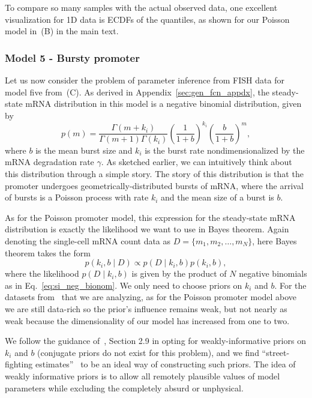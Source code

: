 To compare so many samples with the actual observed data, one excellent
visualization for 1D data is ECDFs of the quantiles, as shown for our Poisson
model in~(B) in the main text. 

\subsubsection{Model 5 - Bursty promoter}

Let us now consider the problem of parameter inference from FISH data for model
five from~(C). As derived in
Appendix~\ref{sec:gen_fcn_appdx}, the steady-state mRNA distribution in this
model is a negative binomial distribution, given by
\begin{equation}
p(m) = \frac{\Gamma(m+k_i)}{\Gamma(m+1)\Gamma(k_i)}
        \left(\frac{1}{1+b}\right)^{k_i}
        \left(\frac{b}{1+b}\right)^m,
\label{eq:si_neg_bionom}
\end{equation}
where $b$ is the mean burst size and $k_i$ is the burst rate nondimensionalized
by the mRNA degradation rate $\gamma$. As sketched earlier, we can intuitively
think about this distribution through a simple story. The story of this
distribution is that the promoter undergoes geometrically-distributed bursts of
mRNA, where the arrival of bursts is a Poisson process with rate $k_i$ and the
mean size of a burst is $b$.

As for the Poisson promoter model, this expression for the steady-state mRNA
distribution is exactly the likelihood we want to use in Bayes theorem. Again
denoting the single-cell mRNA count data as $D=\{m_1, m_2,\dots, m_N\}$, here
Bayes theorem takes the form
\begin{equation}
p(k_i, b \mid D) \propto p(D\mid k_i,b)p(k_i, b),
\end{equation}
where the likelihood $p(D\mid k_i,b)$ is given by the product of $N$ negative
binomials as in Eq.~\ref{eq:si_neg_bionom}. We only need to choose priors on
$k_i$ and $b$. For the datasets from~\cite{Jones2014} that we are analyzing, as
for the Poisson promoter model above we are still data-rich so the prior's
influence remains weak, but not nearly as weak because the dimensionality of our
model has increased from one to two.

We follow the guidance of~\cite{Gelman2013}, Section 2.9 in opting for
weakly-informative priors on $k_i$ and $b$ (conjugate priors do not exist for
this problem), and we find ``street-fighting estimates''~\cite{Mahajan2010} to
be an ideal way of constructing such priors. The idea of weakly informative
priors is to allow all remotely plausible values of model parameters while
excluding the completely absurd or unphysical.


